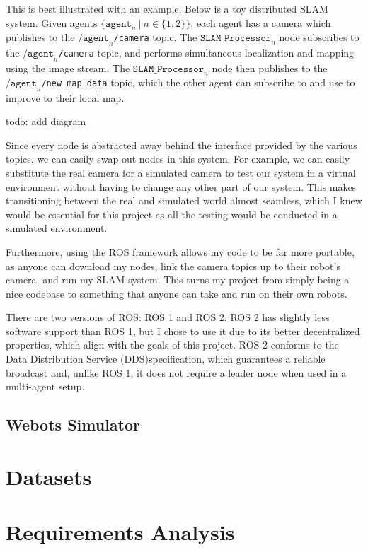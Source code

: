 This is best illustrated with an example. Below is a toy distributed SLAM system. Given agents $\{ \texttt{agent}_n \ | \ n \in \{1, 2\} \}$, each agent has a camera which publishes to the $\texttt{/agent}_n$\verb|/camera| topic. The $\texttt{SLAM\_Processor}_n$ node subscribes to the $\texttt{/agent}_n$\verb|/camera| topic, and performs simultaneous localization and mapping using the image stream. The $\texttt{SLAM\_Processor}_n$ node then publishes to the $\texttt{/agent}_n$\verb|/new_map_data| topic, which the other agent can subscribe to and use to improve to their local map.

todo: add diagram

Since every node is abstracted away behind the interface provided by the various topics, we can easily swap out nodes in this system. For example, we can easily substitute the real camera for a simulated camera to test our system in a virtual environment without having to change any other part of our system. This makes transitioning between the real and simulated world almost seamless, which I knew would be essential for this project as all the testing would be conducted in a simulated environment.

Furthermore, using the ROS framework allows my code to be far more portable, as anyone can download my nodes, link the camera topics up to their robot's camera, and run my SLAM system. This turns my project from simply being a nice codebase to something that anyone can take and run on their own robots.

There are two versions of ROS: ROS 1 and ROS 2. ROS 2 has slightly less software support than ROS 1, but I chose to use it due to its better decentralized properties, which align with the goals of this project. ROS 2 conforms to the Data Distribution Service (DDS)\footnotemark[1] specification, which guarantees a reliable broadcast and, unlike ROS 1, it does not require a leader node when used in a multi-agent setup.


\subsection{Webots Simulator}
\label{sec:webots-simulator}

\section{Datasets}
\label{sec:datasets}

\section{Requirements Analysis}
\label{sec:requirements-analysis}

